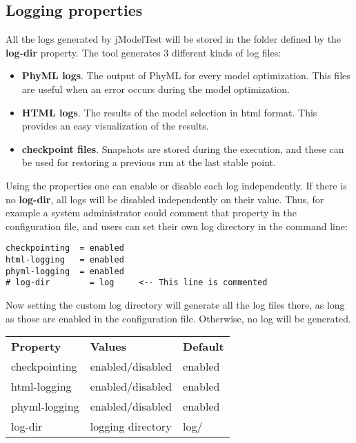 \subsection{Logging properties}

All the logs generated by jModelTest will be stored in the folder defined by the {\bf log-dir} property. The tool generates 3 different kinds of log files:
\begin{itemize}
\item {\bf PhyML logs}. The output of PhyML for every model optimization. This files are useful when an error occurs during the model optimization.
\item {\bf HTML logs}. The results of the model selection in html format. This provides an easy visualization of the results.
\item {\bf checkpoint files}. Snapshots are stored during the execution, and these can be used for restoring a previous run at the last stable point.
\end{itemize}

Using the properties one can enable or disable each log independently. If there is no {\bf log-dir}, all logs will be disabled independently on their value. Thus, for example a system administrator could comment that property in the configuration file, and users can set their own log directory in the command line:

\begin{verbatim}
checkpointing  = enabled
html-logging   = enabled
phyml-logging  = enabled
# log-dir        = log     <-- This line is commented
\end{verbatim}

Now setting the custom log directory will generate all the log files there, as long as those are enabled in the configuration file. Otherwise, no log will be generated.

\begin{center}
\begin{tabular}{|l|l|l|}
\hline
{\bf Property} & {\bf Values} & {\bf Default} \\
checkpointing  & enabled/disabled & enabled \\
html-logging   & enabled/disabled & enabled \\
phyml-logging  & enabled/disabled & enabled \\
log-dir        & logging directory & log/ \\
\hline
\end{tabular}
\end{center}

